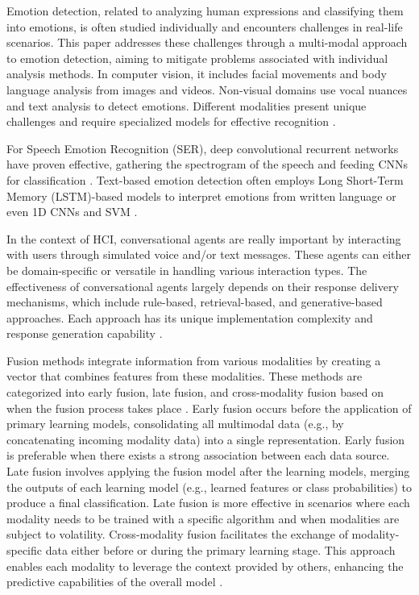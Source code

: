 \documentclass[runningheads]{llncs}
\begin{document}
Emotion detection, related to analyzing human expressions and classifying them into emotions, is often studied individually and encounters challenges in real-life scenarios. This paper addresses these challenges through a multi-modal approach to emotion detection, aiming to mitigate problems associated with individual analysis methods. In computer vision, it includes facial movements and body language analysis from images and videos. Non-visual domains use vocal nuances and text analysis to detect emotions. Different modalities present unique challenges and require specialized models for effective recognition \cite{Chul2018, Trigeorgis2016, Karna2020}.

For Speech Emotion Recognition (SER), deep convolutional recurrent networks have proven effective, gathering the spectrogram of the speech and feeding CNNs for classification \cite{Badshah2017}. Text-based emotion detection often employs Long Short-Term Memory (LSTM)-based models to interpret emotions from written language \cite{Trigeorgis2016, Karna2020} or even 1D CNNs and SVM \cite{hung_beyond_2023}.

In the context of HCI, conversational agents are really important by interacting with users through simulated voice and/or text messages. These agents can either be domain-specific or versatile in handling various interaction types. The effectiveness of conversational agents largely depends on their response delivery mechanisms, which include rule-based, retrieval-based, and generative-based approaches. Each approach has its unique implementation complexity and response generation capability \cite{aljaroodi_avatars_2019, fernandes_survey_2020, ramesh_survey_2017, mohamad_suhaili_service_2021}.

Fusion methods integrate information from various modalities by creating a vector that combines features from these modalities. These methods are categorized into early fusion, late fusion, and cross-modality fusion based on when the fusion process takes place \cite{sleeman_multimodal_2022, zhu_multimodal_2023}. Early fusion occurs before the application of primary learning models, consolidating all multimodal data (e.g., by concatenating incoming modality data) into a single representation. Early fusion is preferable when there exists a strong association between each data source. Late fusion involves applying the fusion model after the learning models, merging the outputs of each learning model (e.g., learned features or class probabilities) to produce a final classification. Late fusion is more effective in scenarios where each modality needs to be trained with a specific algorithm and when modalities are subject to volatility. Cross-modality fusion facilitates the exchange of modality-specific data either before or during the primary learning stage. This approach enables each modality to leverage the context provided by others, enhancing the predictive capabilities of the overall model \cite{sleeman_multimodal_2022}.
\end{document}
